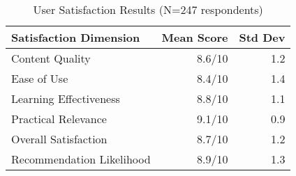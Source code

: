 \begin{table}[H]
\centering
\caption{User Satisfaction Results (N=247 respondents)}
\label{tab:satisfaction}
\begin{tabular}{@{}lrr@{}}
\toprule
\textbf{Satisfaction Dimension} & \textbf{Mean Score} & \textbf{Std Dev} \\
\midrule
Content Quality & 8.6/10 & 1.2 \\
Ease of Use & 8.4/10 & 1.4 \\
Learning Effectiveness & 8.8/10 & 1.1 \\
Practical Relevance & 9.1/10 & 0.9 \\
Overall Satisfaction & 8.7/10 & 1.2 \\
Recommendation Likelihood & 8.9/10 & 1.3 \\
\bottomrule
\end{tabular}
\end{table}